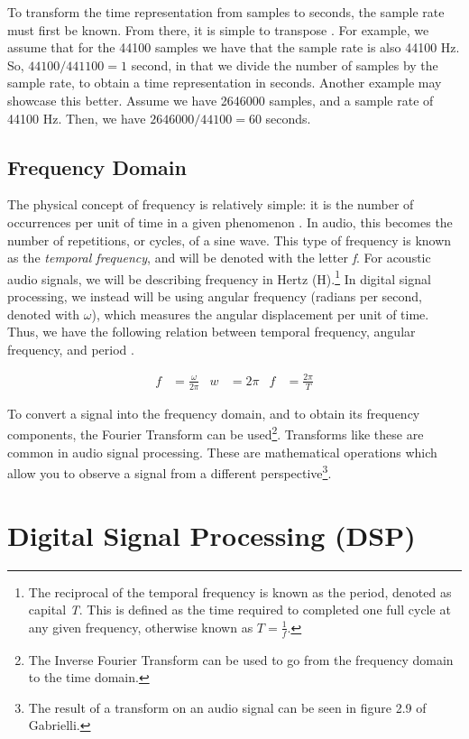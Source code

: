 To transform the time representation from samples to seconds, the sample rate must first be known. From there, it is simple to transpose \cite{Zjalic_2021}. For example, we assume that for the 44100 samples we have that the sample rate is also 44100 Hz. So, $44100 / 441100 = 1$ second, in that we divide the number of samples by the sample rate, to obtain a time representation in seconds. Another example may showcase this better. Assume we have 2646000 samples, and a sample rate of 44100 Hz. Then, we have $2646000/44100 = 60$ seconds.

\subsection{Frequency Domain}
The physical concept of frequency is relatively simple: it is the number of occurrences per unit of time in a given phenomenon \cite{Gabrielli_2020}. In audio, this becomes the number of repetitions, or cycles, of a sine wave. This type of frequency is known as the \textit{temporal frequency}, and will be denoted with the letter \textit{f}. For acoustic audio signals, we will be describing frequency in Hertz (H).\footnote{The reciprocal of the temporal frequency is known as the period, denoted as capital \textit{T}. This is defined as the time required to completed one full cycle at any given frequency, otherwise known as $T = \frac{1}{\textit{f}}$.} In digital signal processing, we instead will be using angular frequency (radians per second, denoted with $\omega$), which measures the angular displacement per unit of time. Thus, we have the following relation between temporal frequency, angular frequency, and period \cite{Gabrielli_2020}.

\begin{align}
    f &= \frac{\omega}{2\pi} &w &= 2\pi &f &= \frac{2\pi}{T}
\end{align}

To convert a signal into the frequency domain, and to obtain its frequency components, the Fourier Transform can be used\footnote{The Inverse Fourier Transform can be used to go from the frequency domain to the time domain.}. Transforms like these are common in audio signal processing. These are mathematical operations which allow you to observe a signal from a different perspective\footnote{The result of a transform on an audio signal can be seen in figure 2.9 of Gabrielli.}.

\section{Digital Signal Processing (DSP)}

